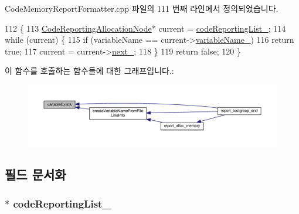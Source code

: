 Code\+Memory\+Report\+Formatter.\+cpp 파일의 111 번째 라인에서 정의되었습니다.


\begin{DoxyCode}
112 \{
113     \hyperlink{struct_code_reporting_allocation_node}{CodeReportingAllocationNode}* current = 
      \hyperlink{class_code_memory_report_formatter_a7256d2e6da45bdd7eaa77637be299e56}{codeReportingList\_};
114     \textcolor{keywordflow}{while} (current) \{
115         \textcolor{keywordflow}{if} (variableName == current->\hyperlink{struct_code_reporting_allocation_node_ac6f8a20a992369f629ef7f014c8a884e}{variableName\_})
116             \textcolor{keywordflow}{return} \textcolor{keyword}{true};
117         current = current->\hyperlink{struct_code_reporting_allocation_node_a8f0c58c5a02860822d947c32e435bd3c}{next\_};
118     \}
119     \textcolor{keywordflow}{return} \textcolor{keyword}{false};
120 \}
\end{DoxyCode}


이 함수를 호출하는 함수들에 대한 그래프입니다.\+:
\nopagebreak
\begin{figure}[H]
\begin{center}
\leavevmode
\includegraphics[width=350pt]{class_code_memory_report_formatter_aebb4bb2cfdbdeca9666a6b426fc126cb_icgraph}
\end{center}
\end{figure}




\subsection{필드 문서화}
\subsubsection[{\texorpdfstring{code\+Reporting\+List\+\_\+}{codeReportingList_}}]{$\ast$ code\+Reporting\+List\+\_\+\hspace{0.3cm}{\ttfamily [private]}}\hypertarget{class_code_memory_report_formatter_a7256d2e6da45bdd7eaa77637be299e56}{}\label{class_code_memory_report_formatter_a7256d2e6da45bdd7eaa77637be299e56}



